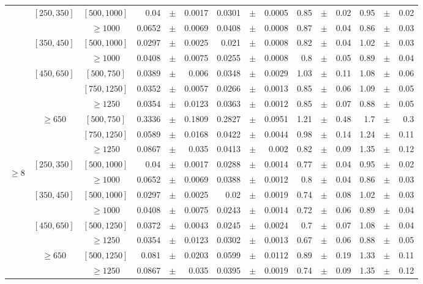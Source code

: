 \begin{table}[ht]
\begin{center}
{\begin{tabular}{|c|c|c|rrr|rrr|rrr|rrr|}
&\multirow{2}{*}{$[250,350]$}
&$[500,1000]$
 & 0.04&$\pm$&0.0017 & 0.0301&$\pm$&0.0005& 0.85&$\pm$&0.02& 0.95&$\pm$&0.02\\
&
&$\geq1000$
 & 0.0652&$\pm$&0.0069 & 0.0408&$\pm$&0.0008& 0.87&$\pm$&0.04& 0.86&$\pm$&0.03\\
\cline{2-15}
&\multirow{2}{*}{$[350,450]$}
&$[500,1000]$
 & 0.0297&$\pm$&0.0025 & 0.021&$\pm$&0.0008& 0.82&$\pm$&0.04& 1.02&$\pm$&0.03\\
&
&$\geq1000$
 & 0.0408&$\pm$&0.0075 & 0.0255&$\pm$&0.0008& 0.8&$\pm$&0.05& 0.89&$\pm$&0.04\\
\cline{2-15}
&\multirow{3}{*}{$[450,650]$}
&$[500,750]$
 & 0.0389&$\pm$&0.006 & 0.0348&$\pm$&0.0029& 1.03&$\pm$&0.11& 1.08&$\pm$&0.06\\
&
&$[750,1250]$
 & 0.0352&$\pm$&0.0057 & 0.0266&$\pm$&0.0013& 0.85&$\pm$&0.06& 1.09&$\pm$&0.05\\
&
&$\geq1250$
 & 0.0354&$\pm$&0.0123 & 0.0363&$\pm$&0.0012& 0.85&$\pm$&0.07& 0.88&$\pm$&0.05\\
\cline{2-15}
&\multirow{3}{*}{$\geq650$}
&$[500,750]$
 & 0.3336&$\pm$&0.1809 & 0.2827&$\pm$&0.0951& 1.21&$\pm$&0.48& 1.7&$\pm$&0.3\\
&
&$[750,1250]$
 & 0.0589&$\pm$&0.0168 & 0.0422&$\pm$&0.0044& 0.98&$\pm$&0.14& 1.24&$\pm$&0.11\\
&
&$\geq1250$
 & 0.0867&$\pm$&0.035 & 0.0413&$\pm$&0.002& 0.82&$\pm$&0.09& 1.35&$\pm$&0.12\\
\cline{2-15}
\hline
\hline
\multirow{8}{*}{\begin{sideways}$\geq8$\end{sideways}}
&\multirow{2}{*}{$[250,350]$}
&$[500,1000]$
 & 0.04&$\pm$&0.0017 & 0.0288&$\pm$&0.0014& 0.77&$\pm$&0.04& 0.95&$\pm$&0.02\\
&
&$\geq1000$
 & 0.0652&$\pm$&0.0069 & 0.0388&$\pm$&0.0012& 0.8&$\pm$&0.04& 0.86&$\pm$&0.03\\
\cline{2-15}
&\multirow{2}{*}{$[350,450]$}
&$[500,1000]$
 & 0.0297&$\pm$&0.0025 & 0.02&$\pm$&0.0019& 0.74&$\pm$&0.08& 1.02&$\pm$&0.03\\
&
&$\geq1000$
 & 0.0408&$\pm$&0.0075 & 0.0243&$\pm$&0.0014& 0.72&$\pm$&0.06& 0.89&$\pm$&0.04\\
\cline{2-15}
&\multirow{2}{*}{$[450,650]$}
&$[500,1250]$
 & 0.0372&$\pm$&0.0043 & 0.0245&$\pm$&0.0024& 0.7&$\pm$&0.07& 1.08&$\pm$&0.04\\
&
&$\geq1250$
 & 0.0354&$\pm$&0.0123 & 0.0302&$\pm$&0.0013& 0.67&$\pm$&0.06& 0.88&$\pm$&0.05\\
\cline{2-15}
&\multirow{2}{*}{$\geq650$}
&$[500,1250]$
 & 0.081&$\pm$&0.0203 & 0.0599&$\pm$&0.0112& 0.89&$\pm$&0.19& 1.33&$\pm$&0.11\\
&
&$\geq1250$
 & 0.0867&$\pm$&0.035 & 0.0395&$\pm$&0.0019& 0.74&$\pm$&0.09& 1.35&$\pm$&0.12\\
\cline{2-15}
\hline\end{tabular}}\end{center}\end{table}
